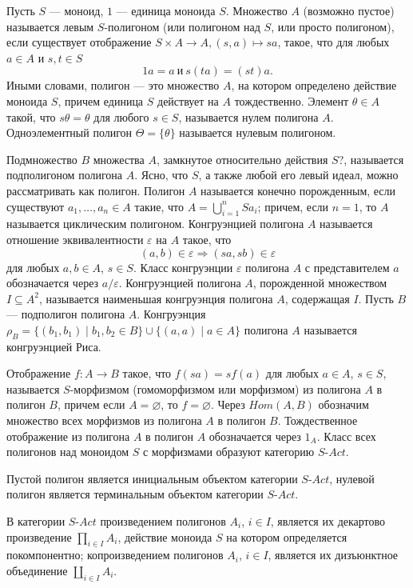 \documentclass[a4paper,12pt]{article}
\newcommand{\SAct}{S\text{-}Act}
\begin{document}
Пусть $S$ --- моноид, $1$ --- единица моноида $S$. Множество $A$ (возможно пустое) называется левым $S$-полигоном (или полигоном над $S$, или просто полигоном), если существует отображение $S \times A \to A, (s,a) \mapsto sa$, такое, что для любых $a \in A$ и $s,t \in S$
$$
    1a = a\ \text{и}\ s(ta) = (st)a.
$$
Иными словами, полигон --- это множество $A$, на котором определено действие моноида $S$, причем единица $S$ действует на $A$ тождественно. Элемент $\theta \in A$ такой, что $s\theta = \theta$ для любого $s \in S$, называется нулем полигона $A$. Одноэлементный полигон $\Theta = \{\theta\}$ называется нулевым полигоном.

Подмножество $B$ множества $A$, замкнутое относительно действия $S$?, называется подполигоном полигона $A$. Ясно, что $S$, а также любой его левый идеал, можно рассматривать как полигон. Полигон $A$ называется конечно порожденным, если существуют $a_1,\ldots,a_n \in A$ такие, что $A = \bigcup_{i=1}^n Sa_i$; причем, если $n=1$, то $A$ называется циклическим полигоном. Конгруэнцией полигона $A$ называется отношение эквивалентности $\varepsilon$ на $A$ такое, что 
$$
    (a,b) \in \varepsilon \Rightarrow (sa,sb) \in \varepsilon 
$$
для любых $a,b \in A$, $s \in S$. Класс конгруэнции $\varepsilon$ полигона $A$ с представителем $a$ обозначается через $a/\varepsilon$. Конгруэнцией полигона $A$, порожденной множеством $I \subseteq A^2$, называется наименьшая конгруэнция полигона $A$, содержащая $I$. Пусть $B$ --- подполигон полигона $A$. Конгруэнция $\rho_B = \{(b_1,b_1) \mid b_1, b_2 \in B\} \cup \{(a, a) \mid a \in A\}$ полигона $A$ называется конгруэнцией Риса.

Отображение $f: A \to B$ такое, что $f(sa) = sf(a)$ для любых $a \in A$, $s \in S$, называется $S$-морфизмом (гомоморфизмом или морфизмом) из полигона $A$ в полигон $B$, причем если $A = \varnothing$, то $f = \varnothing$. Через $Hom(A,B)$ обозначим множество всех морфизмов из полигона $A$ в полигон $B$. Тождественное отображение из полигона $A$ в полигон $A$ обозначается через $1_A$. Класс всех полигонов над моноидом $S$ с морфизмами образуют категорию $\SAct$.

Пустой полигон является инициальным объектом категории $\SAct$, нулевой полигон является терминальным объектом категории $\SAct$.

В категории $\SAct$ произведением полигонов $A_i$, $i \in I$, является их декартово произведение $\prod_{i \in I}A_i$, действие моноида $S$ на котором определяется покомпонентно; копроизведением полигонов $A_i$, $i \in I$, является их дизъюнктное объединение $\coprod_{i \in I}A_i$.
\end{document}
